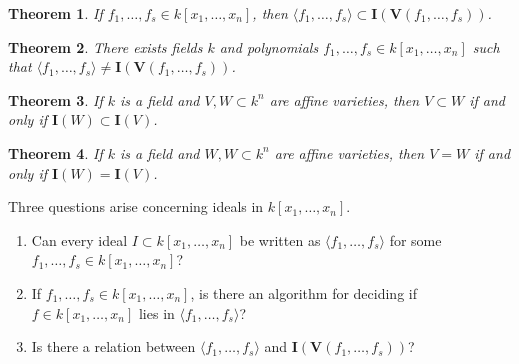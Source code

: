 \documentclass{article}
\theoremstyle{mystyle}
\newtheorem{theorem}{Theorem}[section]
\begin{document}
\begin{theorem}
If $f_1,\hdots, f_s \in k[x_1,\hdots ,x_n]$, then $\langle f_1,\hdots, f_s \rangle \subset \mathbf{I}(\mathbf{V}(f_1,\hdots, f_s))$.
\end{theorem}
\begin{theorem}
There exists fields $k$ and polynomials $f_1,\hdots, f_s\in k[x_1,\hdots ,x_n]$ such that $\langle f_1,\hdots,f_s\rangle \ne \mathbf{I}(\mathbf{V}(f_1,\hdots, f_s))$.
\end{theorem}
\begin{theorem}
If $k$ is a field and $V,W\subset k^n$ are affine varieties, then $V\subset W$ if and only if $\mathbf{I}(W)\subset \mathbf{I}(V)$.
\end{theorem}
\begin{theorem}
If $k$ is a field and $W,W\subset k^n$ are affine varieties, then $V=W$ if and only if $\mathbf{I}(W)=\mathbf{I}(V)$.
\end{theorem}
Three questions arise concerning ideals in $k[x_1,\hdots ,x_n]$.
\begin{enumerate}
    \item Can every ideal $I\subset k[x_1,\hdots ,x_n]$ be written as $\langle f_1,\hdots, f_s\rangle$ for some $f_1,\hdots, f_s \in k[x_1,\hdots ,x_n]$?
    \item If $f_1,\hdots, f_s\in k[x_1,\hdots ,x_n]$, is there an algorithm for deciding if $f\in k[x_1,\hdots ,x_n]$ lies in $\langle f_1,\hdots, f_s\rangle$?
    \item Is there a relation between $\langle f_1,\hdots, f_s\rangle$ and $\mathbf{I}(\mathbf{V}(f_1,\hdots, f_s))$?
\end{enumerate}
\end{document}
